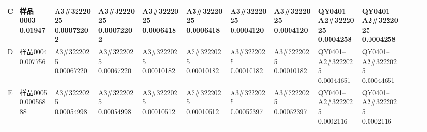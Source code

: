 \documentclass[UTF8,10pt,a4paper,fontset=fandol]{ctexart}
\begin{document}
\begin{center}
\begin{tabular}{c|*{12}{p{0.55cm}|}}
\\ \hline
C &
\shortstack{样品0003\\0.01947} &
\shortstack{A3\#3222025\\0.00072202} &
\shortstack{A3\#3222025\\0.00072202} &
\shortstack{A3\#3222025\\0.0006418} &
\shortstack{A3\#3222025\\0.0006418} &
\shortstack{A3\#3222025\\0.0004120} &
\shortstack{A3\#3222025\\0.0004120} &
\shortstack{QY0401--\\A2\#3222025\\0.0004258} &
\shortstack{QY0401--\\A2\#3222025\\0.0004258} &
 &
 &
\\ \hline
D &
\shortstack{样品0004\\0.007756} &
\shortstack{A3\#3222025\\0.00067220} &
\shortstack{A3\#3222025\\0.00067220} &
\shortstack{A3\#3222025\\0.00010182} &
\shortstack{A3\#3222025\\0.00010182} &
\shortstack{A3\#3222025\\0.00010182} &
\shortstack{A3\#3222025\\0.00010182} &
\shortstack{QY0401--\\A2\#3222025\\0.00044651} &
\shortstack{QY0401--\\A2\#3222025\\0.00044651} &
 &
 &
\\ \hline
E &
\shortstack{样品0005\\0.00056888} &
\shortstack{A3\#3222025\\0.00054998} &
\shortstack{A3\#3222025\\0.00054998} &
\shortstack{A3\#3222025\\0.00010512} &
\shortstack{A3\#3222025\\0.00010512} &
\shortstack{A3\#3222025\\0.00052397} &
\shortstack{A3\#3222025\\0.00052397} &
\shortstack{QY0401--\\A2\#3222025\\0.0002116} &
\shortstack{QY0401--\\A2\#3222025\\0.0002116} &
 &
 &
\\ \hline

\end{tabular}
\end{center}
\end{document}
